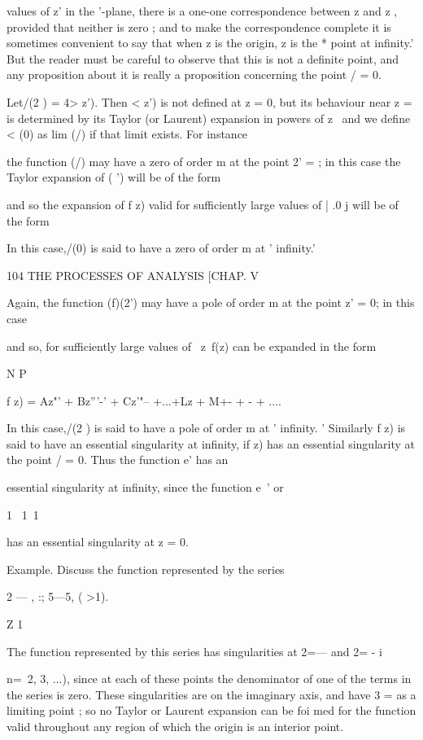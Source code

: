 {{{{values of z' in the '-plane, there is a one-one correspondence between
z and z , provided that neither is zero ; and to make the
correspondence complete it is sometimes convenient to say that when z
is the origin, z is the * point at infinity.' But the reader must be
careful to observe that this is not a definite point, and any
proposition about it is really a proposition concerning the point / =
0.

Let/(2 ) = 4> z'). Then < z') is not defined at z = 0, but its
behaviour near z = is determined by its Taylor (or Laurent) expansion
in powers of z \ and we define < (0) as lim (/) if that limit exists.
For instance

the function (/) may have a zero of order m at the point 2' = ; in
this case the Taylor expansion of ( ') will be of the form

and so the expansion of f z) valid for sufficiently large values of |
.0 j will be of the form

In this case,/(0) is said to have a zero of order m at ' infinity.'



104 THE PROCESSES OF ANALYSIS [CHAP. V

Again, the function (f)(2') may have a pole of order m at the point z'
= 0; in this case

and so, for sufficiently large values of \ z\, f(z) can be expanded in
the form

N P

f z) = Az"' + Bz'''-' + Cz'"-- +...+Lz + M+- + - + ....

In this case,/(2 ) is said to have a pole of order m at ' infinity. '
Similarly f z) is said to have an essential singularity at infinity,
if z) has an essential singularity at the point / = 0. Thus the
function e' has an

essential singularity at infinity, since the function e~' or

1 \ 1\ 1

has an essential singularity at z = 0.

Example. Discuss the function represented by the series

2 — , :; 5—5, ( >1).

Z 1

The function represented by this series has singularities at 2=— and
2= - i

 n=\, 2, 3, ...), since at each of these points the denominator of one
of the terms in the series is zero. These singularities are on the
imaginary axis, and have 3 = as a limiting point ; so no Taylor or
Laurent expansion can be foi med for the function valid throughout any
region of which the origin is an interior point.

}}}}
